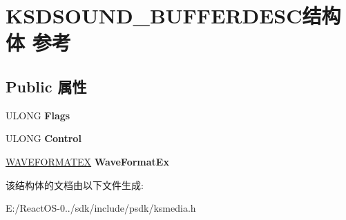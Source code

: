 \hypertarget{struct_k_s_d_s_o_u_n_d___b_u_f_f_e_r_d_e_s_c}{}\section{K\+S\+D\+S\+O\+U\+N\+D\+\_\+\+B\+U\+F\+F\+E\+R\+D\+E\+S\+C结构体 参考}
\label{struct_k_s_d_s_o_u_n_d___b_u_f_f_e_r_d_e_s_c}
\subsection*{Public 属性}
\begin{DoxyCompactItemize}
\item 
\mbox{\label{struct_k_s_d_s_o_u_n_d___b_u_f_f_e_r_d_e_s_c_abbaab72ee78740fa4cf30b311cbb2ffd}} 
U\+L\+O\+NG {\bfseries Flags}
\item 
\mbox{\label{struct_k_s_d_s_o_u_n_d___b_u_f_f_e_r_d_e_s_c_aadcb9542aabcf41cbc0d5f5d314964c3}} 
U\+L\+O\+NG {\bfseries Control}
\item 
\mbox{\label{struct_k_s_d_s_o_u_n_d___b_u_f_f_e_r_d_e_s_c_af5c1f48873f5ccf76049bd6f98e440c8}} 
\hyperlink{struct_w_a_v_e_f_o_r_m_a_t_e_x}{W\+A\+V\+E\+F\+O\+R\+M\+A\+T\+EX} {\bfseries Wave\+Format\+Ex}
\end{DoxyCompactItemize}


该结构体的文档由以下文件生成\+:\begin{DoxyCompactItemize}
\item 
E\+:/\+React\+O\+S-\/0../sdk/include/psdk/ksmedia.\+h\end{DoxyCompactItemize}
